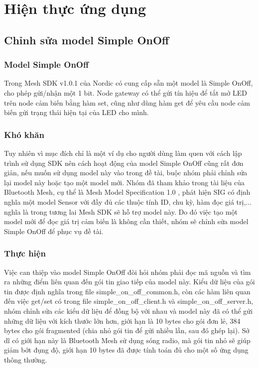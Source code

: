 \chapter{Hiện thực ứng dụng}
    \section{Chỉnh sửa model Simple OnOff}\label{simpleonoff}
        \subsection{Model Simple OnOff}
        Trong Mesh SDK v1.0.1 của Nordic có cung cấp sẵn một model là Simple OnOff, cho phép gửi/nhận một 1 bit. Node gateway có thể gửi tín hiệu để tắt mở LED trên node cảm biến bằng hàm set, cũng như dùng hàm get để yêu cầu node cảm biến gửi trạng thái hiện tại của LED cho mình.
        \subsection{Khó khăn}
        Tuy nhiên vì mục đích chỉ là một ví dụ cho người dùng làm quen với cách lập trình sử dụng SDK nên cách hoạt động của model Simple OnOff cũng rất đơn giản, nếu muốn sử dụng model này vào trong đề tài, buộc nhóm phải chỉnh sửa lại model này hoặc tạo một model mới. Nhóm đã tham khảo trong tài liệu của Bluetooth Mesh, cụ thể là Mesh Model Specification 1.0 \cite{meshspec}, phát hiện SIG có định nghĩa một model Sensor với đầy đủ các thuộc tính ID, chu kỳ, hàm đọc giá trị,... nghĩa là trong tương lai Mesh SDK sẽ hỗ trợ model này. Do đó việc tạo một model mới để đọc giá trị cảm biến là không cần thiết, nhóm sẽ chỉnh sửa model Simple OnOff để phục vụ đề tài.
        \subsection{Thực hiện}
        Việc can thiệp vào model Simple OnOff đòi hỏi nhóm phải đọc mã nguồn và tìm ra những điểm liên quan đến gói tin giao tiếp của model này. Kiểu dữ liệu của gói tin được định nghĩa trong file simple\_on\_off\_common.h, còn các hàm liên quan đến việc get/set có trong file simple\_on\_off\_client.h và simple\_on\_off\_server.h, nhóm chỉnh sửa các kiểu dữ liệu để đồng bộ với nhau và model này đã có thể gửi những dữ liệu với kích thước lớn hơn, giới hạn là 10 bytes cho gói đơn lẻ, 384 bytes cho gói fragmented (chia nhỏ gói tin để gửi nhiều lần, sau đó ghép lại)\cite{nordiccase125876}. Sở dĩ có giới hạn này là Bluetooth Mesh sử dụng sóng radio, mà gói tin nhỏ sẽ giúp giảm bớt đụng độ, giới hạn 10 bytes đã được tính toán đủ cho một số ứng dụng thông thường.
